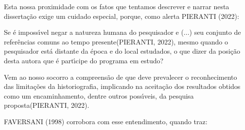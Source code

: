 \documentclass[
12pt,		%
openright,	%
twoside,  %
a4paper,			%
chapter=TITLE,		%
english,			%
french,				%
spanish,			%
brazil				%
]{USPSC-classe/USPSC}
\begin{document}
Esta nossa proximidade com os fatos que tentamos descrever e narrar nesta disserta\c{c}\~ao exige um cuidado especial, porque, como alerta  PIERANTI (2022):











\noindent\begin{center}\mbox{\centering{}}\end{center}


Se \'e imposs\'{\i}vel \textquotedbl negar a natureza humana do pesquisador e (...) seu conjunto de refer\^encias comuns ao tempo presente\textquotedbl  (PIERANTI, 2022), mesmo quando o pesquisador est\'a \textquotedbl distante da \'epoca e do local estudados\textquotedbl , o que dizer da posi\c{c}\~ao desta autora que \'e part\'{\i}cipe do programa em estudo?










Vem ao nosso socorro a compreens\~ao de que \textquotedbl deve prevalecer o reconhecimento das limita\c{c}\~oes da historiografia, implicando na aceita\c{c}\~ao dos resultados obtidos como um encaminhamento, dentre outros poss\'{\i}veis, da pesquisa proposta\textquotedbl  (PIERANTI, 2022).










 FAVERSANI (1998) corrobora com esse entendimento, quando traz:











\noindent\begin{center}\mbox{\centering{}}\end{center}
\end{document}
